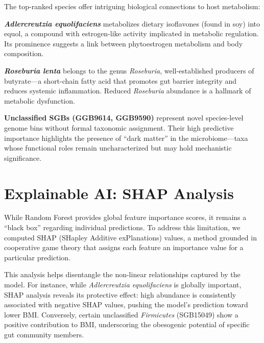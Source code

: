 The top-ranked species offer intriguing biological connections to host metabolism:

\textbf{\emph{Adlercreutzia equolifaciens}} metabolizes dietary isoflavones (found in soy) into equol, a compound with estrogen-like activity implicated in metabolic regulation. Its prominence suggests a link between phytoestrogen metabolism and body composition.

\textbf{\emph{Roseburia lenta}} belongs to the genus \emph{Roseburia}, well-established producers of butyrate---a short-chain fatty acid that promotes gut barrier integrity and reduces systemic inflammation. Reduced \emph{Roseburia} abundance is a hallmark of metabolic dysfunction.

\textbf{Unclassified SGBs (GGB9614, GGB9590)} represent novel species-level genome bins without formal taxonomic assignment. Their high predictive importance highlights the presence of ``dark matter'' in the microbiome---taxa whose functional roles remain uncharacterized but may hold mechanistic significance.

\section{Explainable AI: SHAP Analysis}

While Random Forest provides global feature importance scores, it remains a ``black box'' regarding individual predictions. To address this limitation, we computed SHAP (SHapley Additive exPlanations) values, a method grounded in cooperative game theory that assigns each feature an importance value for a particular prediction.

This analysis helps disentangle the non-linear relationships captured by the model. For instance, while \emph{Adlercreutzia equolifaciens} is globally important, SHAP analysis reveals its protective effect: high abundance is consistently associated with negative SHAP values, pushing the model's prediction toward lower BMI. Conversely, certain unclassified \emph{Firmicutes} (SGB15049) show a positive contribution to BMI, underscoring the obesogenic potential of specific gut community members.


